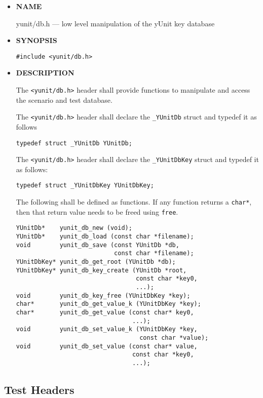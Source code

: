 \documentclass{article}
\begin{document}
\begin{itemize}
\item {\bf NAME}

   yunit/db.h --- low level manipulation of the yUnit key database

\item {\bf SYNOPSIS}

   \verb|#include <yunit/db.h>|

\item {\bf DESCRIPTION}

   The \verb|<yunit/db.h>| header shall provide functions to manipulate and
   access the scenario and test database.

   The \verb|<yunit/db.h>| header shall declare the \verb|_YUnitDb|
   struct and typedef it as follows

\begin{verbatim}
typedef struct _YUnitDb YUnitDb;
\end{verbatim}

   The \verb|<yunit/db.h>| header shall declare the \verb|_YUnitDbKey|
   struct and typedef it as follows:
\begin{verbatim}
typedef struct _YUnitDbKey YUnitDbKey;
\end{verbatim}

   The following shall be defined as functions. If any function
   returns a \verb|char*|, then that return value needs to be freed
   using \verb|free|.
\begin{verbatim}
YUnitDb*    yunit_db_new (void);
YUnitDb*    yunit_db_load (const char *filename);
void        yunit_db_save (const YUnitDb *db,
                           const char *filename);
YUnitDbKey* yunit_db_get_root (YUnitDb *db);
YUnitDbKey* yunit_db_key_create (YUnitDb *root,
                                 const char *key0,
                                 ...);
void        yunit_db_key_free (YUnitDbKey *key);
char*       yunit_db_get_value_k (YUnitDbKey *key);
char*       yunit_db_get_value (const char* key0,
                                ...);
void        yunit_db_set_value_k (YUnitDbKey *key,
                                  const char *value);
void        yunit_db_set_value (const char* value,
                                const char *key0,
                                ...);
\end{verbatim}

\end{itemize}
\pagebreak
\subsection{Test Headers}
\end{document}
